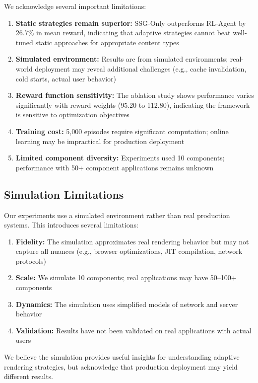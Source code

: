 \documentclass[10pt,twocolumn]{article}
\begin{document}
We acknowledge several important limitations:

\begin{enumerate}[nosep]
\item \textbf{Static strategies remain superior:} SSG-Only outperforms RL-Agent by 26.7\% in mean reward, indicating that adaptive strategies cannot beat well-tuned static approaches for appropriate content types
\item \textbf{Simulated environment:} Results are from simulated environments; real-world deployment may reveal additional challenges (e.g., cache invalidation, cold starts, actual user behavior)
\item \textbf{Reward function sensitivity:} The ablation study shows performance varies significantly with reward weights (95.20 to 112.80), indicating the framework is sensitive to optimization objectives
\item \textbf{Training cost:} 5,000 episodes require significant computation; online learning may be impractical for production deployment
\item \textbf{Limited component diversity:} Experiments used 10 components; performance with 50+ component applications remains unknown
\end{enumerate}

\subsection{Simulation Limitations}

Our experiments use a simulated environment rather than real production systems. This introduces several limitations:

\begin{enumerate}[nosep]
\item \textbf{Fidelity:} The simulation approximates real rendering behavior but may not capture all nuances (e.g., browser optimizations, JIT compilation, network protocols)
\item \textbf{Scale:} We simulate 10 components; real applications may have 50--100+ components
\item \textbf{Dynamics:} The simulation uses simplified models of network and server behavior
\item \textbf{Validation:} Results have not been validated on real applications with actual users
\end{enumerate}

We believe the simulation provides useful insights for understanding adaptive rendering strategies, but acknowledge that production deployment may yield different results.
\end{document}
